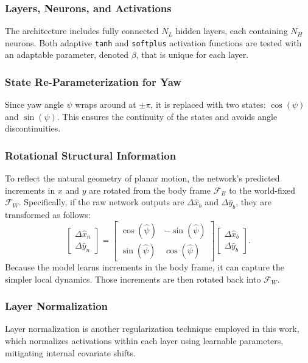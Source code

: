\documentclass[conference]{IEEEtran}
\begin{document}
\subsubsection{Layers, Neurons, and Activations}
The architecture includes fully connected $N_L$ hidden layers, each containing $N_H$ neurons. Both adaptive \lstinline|tanh| and \lstinline|softplus| activation functions are tested with an adaptable parameter, denoted $\beta$, that is unique for each layer.

\subsubsection{State Re-Parameterization for Yaw}
Since yaw angle $\psi$ wraps around at $\pm\pi$, it is replaced with two states: $\cos(\psi)$ and $\sin(\psi)$. This ensures the continuity of the states and avoids angle discontinuities. 

\subsubsection{Rotational Structural Information}
To reflect the natural geometry of planar motion, the network’s predicted increments in $x$ and $y$ are rotated from the body frame $\mathcal{F}_B$ to the world-fixed $\mathcal{F}_W$. Specifically, if the raw network outputs are $\Delta \hat{x}_b$ and $\Delta \hat{y}_b$, they are transformed as follows:
\begin{equation}
    \begin{bmatrix}
        \Delta\hat{x}_n\\
        \Delta\hat{y}_n
    \end{bmatrix}=
    \begin{bmatrix}
        \cos(\hat{\psi}) & -\sin(\hat{\psi})\\
        \sin(\hat{\psi}) & \cos(\hat{\psi})
    \end{bmatrix}
    \begin{bmatrix}
        \Delta\hat{x}_b\\
        \Delta\hat{y}_b
    \end{bmatrix}.
\end{equation}
Because the model learns increments in the body frame, it can capture the simpler local dynamics. Those increments are then rotated back into $\mathcal{F}_W$.

\subsubsection{Layer Normalization} 
Layer normalization \cite{ba_layer_2016} is another regularization technique employed in this work, which normalizes activations within each layer using learnable parameters, mitigating internal covariate shifts. 
\end{document}

